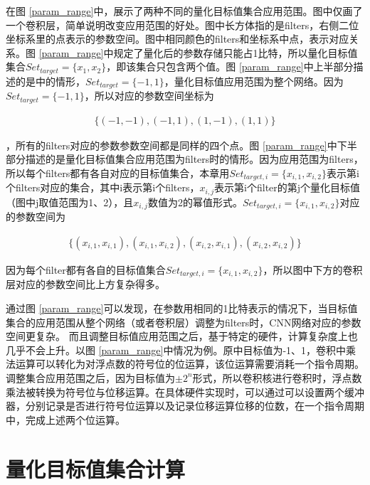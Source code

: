 \documentclass[ pdftex, oneside, master]{NJUthesis}
\begin{document}

在图 \ref{param_range}中，展示了两种不同的量化目标值集合应用范围。图中仅画了一个卷积层，简单说明改变应用范围的好处。图中长方体指的是filters，右侧二位坐标系里的点表示的参数空间。图中相同颜色的filters和坐标系中点，表示对应关系。图 \ref{param_range}中规定了量化后的参数存储只能占1比特，所以量化目标值集合$Set_ {target} = \{x_1, x_2\}$，即该集合只包含两个值。图 \ref{param_range}中上半部分描述的是\cite{binary}中的情形，$Set_ {target} = \{-1, 1\}$，量化目标值应用范围为整个网络。因为$Set_ {target} = \{-1, 1\}$，所以对应的参数空间坐标为

\begin{eqnarray}
\{(-1,-1), (-1,1), (1,-1), (1,1)\}
\end{eqnarray}

，所有的filters对应的参数参数空间都是同样的四个点。图 \ref{param_range}中下半部分描述的是量化目标值集合应用范围为filters时的情形。因为应用范围为filters，所以每个filters都有各自对应的目标值集合，本章用$Set_ {target,i} = \{x_{i,1}, x_{i,2}\}$表示第i个filters对应的集合，其中i表示第i个filters，$x_{i,j}$表示第i个filter的第j个量化目标值（图中j取值范围为1、2），且$x_{i,j}$数值为2的幂值形式。$Set_ {target,i} = \{x_{i,1}, x_{i,2}\}$对应的参数空间为

\begin{eqnarray}
\{(x_{i,1}, x_{i,1}), (x_{i,1}, x_{i,2}), (x_{i,2}, x_{i,1}), (x_{i,2}, x_{i,2})\}
\end{eqnarray}

\noindent 因为每个filter都有各自的目标值集合$Set_ {target,i} = \{x_{i,1}, x_{i,2}\}$，所以图中下方的卷积层对应的参数空间比上方复杂得多。

通过图 \ref{param_range}可以发现，在参数用相同的1比特表示的情况下，当目标值集合的应用范围从整个网络（或者卷积层）调整为filters时，CNN网络对应的参数空间更复杂。
而且调整目标值应用范围之后，基于特定的硬件，计算复杂度上也几乎不会上升。以图 \ref{param_range}中情况为例。原\cite{binary}中目标值为-1、1，卷积中乘法运算可以转化为对浮点数的符号位的位运算，该位运算需要消耗一个指令周期。调整集合应用范围之后，因为目标值为$\pm 2^n$形式，所以卷积核进行卷积时，浮点数乘法被转换为符号位与位移运算。在具体硬件实现时，可以通过可以设置两个缓冲器，分别记录是否进行符号位运算以及记录位移运算位移的位数，在一个指令周期中，完成上述两个位运算。

\section{量化目标值集合计算}
\end{document}
